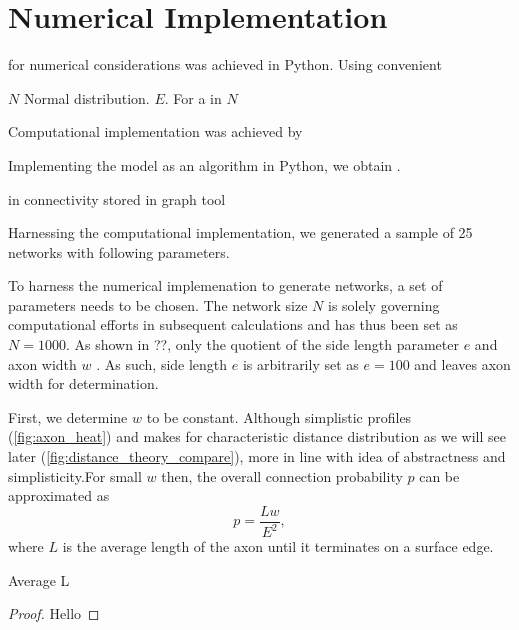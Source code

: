 \section{Numerical Implementation}\label{numerical_implementation}

for numerical considerations was achieved in Python. Using convenient 



$N$ Normal distribution. $E$. For a in $N$ 

Computational implementation was achieved by 




Implementing the model as an algorithm in Python, we obtain .

 in connectivity stored in graph
tool \parencite{graph_tool} %

Harnessing the computational implementation, we generated a sample of
25 networks with following parameters. 



To harness the numerical implemenation to generate networks, a set
of parameters needs to be chosen. The network size $N$ is solely
governing computational efforts in subsequent calculations and has
thus been set as $N = 1000$. As shown in ??, only the quotient of
the side length parameter $e$ and axon width $w$  . As such, side
length $e$ is arbitrarily set as $e = 100$ and leaves axon width for
determination. 

First, we determine $w$ to be constant. Although simplistic profiles
(\autoref{fig:axon_heat}) and makes for characteristic distance
distribution as we will see later
(\autoref{fig:distance_theory_compare}), more in line with idea of
abstractness and simplisticity.For small $w$ then, the overall
connection probability $p$ can be approximated as
\[
p = \frac{L w}{E^2},
\]
where $L$ is the average length of the axon until it terminates on a
surface edge. 

\begin{proposition}
Average L
\end{proposition}

\begin{proof}
Hello
\end{proof}


